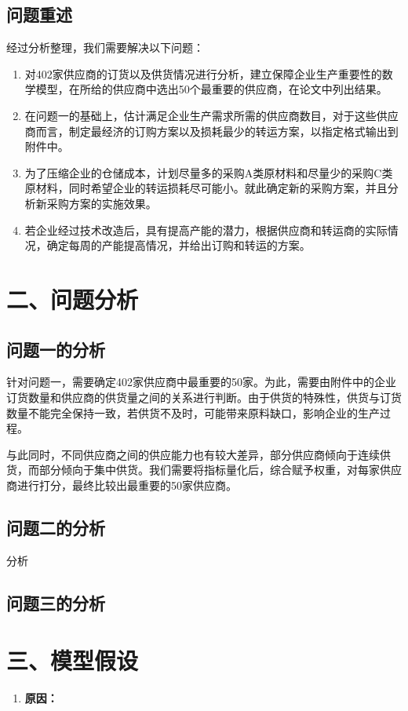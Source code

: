 \documentclass{my_paper}
\begin{document}
\subsection{问题重述}
经过分析整理，我们需要解决以下问题：
\begin{enumerate}
    \item 对402家供应商的订货以及供货情况进行分析，建立保障企业生产重要性的数学模型，在所给的供应商中选出50个最重要的供应商，在论文中列出结果。
    \item 在问题一的基础上，估计满足企业生产需求所需的供应商数目，对于这些供应商而言，制定最经济的订购方案以及损耗最少的转运方案，以指定格式输出到附件中。
    \item 为了压缩企业的仓储成本，计划尽量多的采购A类原材料和尽量少的采购C类原材料，同时希望企业的转运损耗尽可能小。就此确定新的采购方案，并且分析新采购方案的实施效果。
    \item 若企业经过技术改造后，具有提高产能的潜力，根据供应商和转运商的实际情况，确定每周的产能提高情况，并给出订购和转运的方案。
\end{enumerate}
\section{二、问题分析}
\subsection{问题一的分析}

针对问题一，需要确定402家供应商中最重要的50家。为此，需要由附件中的企业订货数量和供应商的供货量之间的关系进行判断。由于供货的特殊性，供货与订货数量不能完全保持一致，若供货不及时，可能带来原料缺口，影响企业的生产过程。

与此同时，不同供应商之间的供应能力也有较大差异，部分供应商倾向于连续供货，而部分倾向于集中供货。我们需要将指标量化后，综合赋予权重，对每家供应商进行打分，最终比较出最重要的50家供应商。

\subsection{问题二的分析}

分析

\subsection{问题三的分析}


\section{三、模型假设}
\begin{enumerate}
    \item 
    
    \textbf{原因：}


\end{enumerate}
\end{document}
